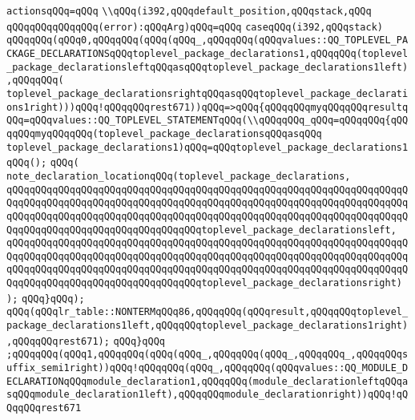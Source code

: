 \verb|actionsqQQq=qQQq|\newline
\verb|\\qQQq(i392,qQQqdefault_position,qQQqstack,qQQq|\newline
\verb|qQQqqQQqqQQqqQQq(error):qQQqArg)qQQq=qQQq|\newline
\verb|caseqQQq(i392,qQQqstack)|\newline
\verb|qQQqqQQq(qQQq0,qQQqqQQq(qQQq(qQQq_,qQQqqQQq(qQQqvalues::QQ_TOPLEVEL_PACKAGE_DECLARATIONSqQQqtoplevel_package_declarations1,qQQqqQQq(toplevel_package_declarationsleftqQQqasqQQqtoplevel_package_declarations1left),qQQqqQQq(|\newline
\verb|toplevel_package_declarationsrightqQQqasqQQqtoplevel_package_declarations1right)))qQQq!qQQqqQQqrest671))qQQq=>qQQq{qQQqqQQqmyqQQqqQQqresultqQQq=qQQqvalues::QQ_TOPLEVEL_STATEMENTqQQq(\\qQQqqQQq_qQQq=qQQqqQQq{qQQqqQQqmyqQQqqQQq(toplevel_package_declarationsqQQqasqQQq|\newline
\verb|toplevel_package_declarations1)qQQq=qQQqtoplevel_package_declarations1qQQq();|\newline
\verb|qQQq(|\newline
\verb|note_declaration_locationqQQq(toplevel_package_declarations,|\newline
\verb|qQQqqQQqqQQqqQQqqQQqqQQqqQQqqQQqqQQqqQQqqQQqqQQqqQQqqQQqqQQqqQQqqQQqqQQqqQQqqQQqqQQqqQQqqQQqqQQqqQQqqQQqqQQqqQQqqQQqqQQqqQQqqQQqqQQqqQQqqQQqqQQqqQQqqQQqqQQqqQQqqQQqqQQqqQQqqQQqqQQqqQQqqQQqqQQqqQQqqQQqqQQqqQQqqQQqqQQqqQQqqQQqqQQqqQQqqQQqqQQqqQQqtoplevel_package_declarationsleft,|\newline
\verb|qQQqqQQqqQQqqQQqqQQqqQQqqQQqqQQqqQQqqQQqqQQqqQQqqQQqqQQqqQQqqQQqqQQqqQQqqQQqqQQqqQQqqQQqqQQqqQQqqQQqqQQqqQQqqQQqqQQqqQQqqQQqqQQqqQQqqQQqqQQqqQQqqQQqqQQqqQQqqQQqqQQqqQQqqQQqqQQqqQQqqQQqqQQqqQQqqQQqqQQqqQQqqQQqqQQqqQQqqQQqqQQqqQQqqQQqqQQqqQQqqQQqtoplevel_package_declarationsright)|\newline
\verb|);|\newline
\verb|qQQq}qQQq);|\newline
\verb|qQQq(qQQqlr_table::NONTERMqQQq86,qQQqqQQq(qQQqresult,qQQqqQQqtoplevel_package_declarations1left,qQQqqQQqtoplevel_package_declarations1right),qQQqqQQqrest671);|\newline
\verb|qQQq}qQQq|\newline
\verb|;qQQqqQQq(qQQq1,qQQqqQQq(qQQq(qQQq_,qQQqqQQq(qQQq_,qQQqqQQq_,qQQqqQQqsuffix_semi1right))qQQq!qQQqqQQq(qQQq_,qQQqqQQq(qQQqvalues::QQ_MODULE_DECLARATIONqQQqmodule_declaration1,qQQqqQQq(module_declarationleftqQQqasqQQqmodule_declaration1left),qQQqqQQqmodule_declarationright))qQQq!qQQqqQQqrest671|\newline
